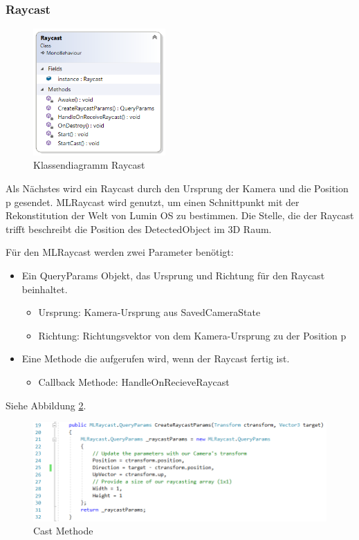 \subsubsection{Raycast}

\begin{figure}[H]
	\centering
	\includegraphics[width=0.45\textwidth]{images/dia_raycast.PNG}
	\caption[]{Klassendiagramm Raycast}
	\label{dia:raycast}
\end{figure}

Als Nächstes wird ein Raycast durch den Ursprung der Kamera und die Position p gesendet. MLRaycast wird genutzt, um einen Schnittpunkt mit der Rekonstitution der Welt von Lumin OS zu bestimmen. Die Stelle, die der Raycast trifft beschreibt die Position des DetectedObject im 3D Raum.

Für den MLRaycast werden zwei Parameter benötigt:
\begin{itemize}
	\item Ein QueryParams Objekt, das Ursprung und Richtung für den Raycast beinhaltet.
	\begin{itemize}
		\item Ursprung: Kamera-Ursprung aus SavedCameraState
		\item Richtung: Richtungsvektor von dem Kamera-Ursprung zu der Position p
	\end{itemize}
	\item Eine Methode die aufgerufen wird, wenn der Raycast fertig ist. 
	\begin{itemize}
		\item Callback Methode: HandleOnRecieveRaycast
	\end{itemize}
\end{itemize}

Siehe Abbildung \ref{code:raycastparams}.

\begin{figure}[H]
	\centering
	\includegraphics[width=1\textwidth]{images/code_raycastparams.PNG}
	\caption[]{Cast Methode}
	\label{code:raycastparams}
\end{figure}

